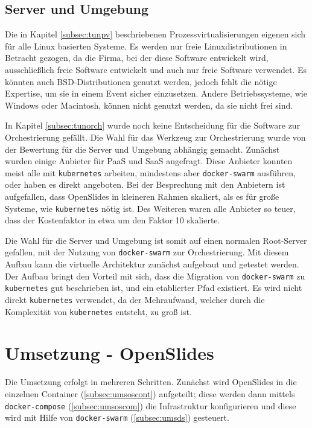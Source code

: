 \documentclass[11pt,a4paper]{article}
\begin{document}
\subsection{Server und Umgebung}
\label{subsec:tunsu}
Die in Kapitel \ref{subsec:tunpv} beschriebenen Prozessvirtualisierungen 
eigenen sich für alle Linux basierten Systeme. Es werden nur freie 
Linuxdistributionen in Betracht gezogen, da die Firma, bei der diese Software 
entwickelt wird, ausschließlich freie Software entwickelt und auch nur freie 
Software verwendet. Es könnten auch BSD-Distributionen genutzt werden, jedoch 
fehlt die nötige Expertise, um sie in einem Event sicher einzusetzen. Andere 
Betriebssysteme, wie Windows oder Macintosh, können nicht genutzt werden, da 
sie nicht frei sind.

In Kapitel \ref{subsec:tunorch} wurde noch keine Entscheidung für die Software 
zur Orchestrierung gefällt. Die Wahl für das Werkzeug zur Orchestrierung wurde 
von der Bewertung für die Server und Umgebung abhängig gemacht. Zunächst wurden 
einige Anbieter für \ac{PaaS} und \ac{SaaS} angefragt. Diese Anbieter konnten 
meist alle mit \texttt{kubernetes} arbeiten, mindestens aber 
\texttt{docker-swarm} ausführen, oder haben es direkt angeboten. Bei der 
Besprechung mit den Anbietern ist aufgefallen, dass OpenSlides in kleineren 
Rahmen skaliert, als es für große Systeme, wie \texttt{kubernetes} nötig ist. 
Des Weiteren waren alle Anbieter so teuer, dass der Kostenfaktor in etwa um den 
Faktor 10 skalierte.

Die Wahl für die Server und Umgebung ist somit auf einen normalen Root-Server 
gefallen, mit der Nutzung von \texttt{docker-swarm} zur Orchestrierung. Mit 
diesem Aufbau kann die virtuelle Architektur zunächst aufgebaut und getestet 
werden. Der Aufbau bringt den Vorteil mit sich, dass die Migration von 
\texttt{docker-swarm} zu \texttt{kubernetes} gut beschrieben ist, und ein 
etablierter Pfad existiert. Es wird nicht direkt \texttt{kubernetes} verwendet, 
da der Mehraufwand, welcher durch die Komplexität von \texttt{kubernetes} 
entsteht, zu groß ist.
\clearpage
\section{Umsetzung - OpenSlides}
\label{sec:umsos}
Die Umsetzung erfolgt in mehreren Schritten. Zunächst wird OpenSlides in die 
einzelnen Container (\ref{subsec:umsoscont}) aufgeteilt; diese werden dann 
mittels \texttt{docker-compose} (\ref{subsec:umsoscom}) die Infrastruktur 
konfigurieren und diese wird mit Hilfe von \texttt{docker-swarm} 
(\ref{subsec:umsds}) gesteuert.
\end{document}
